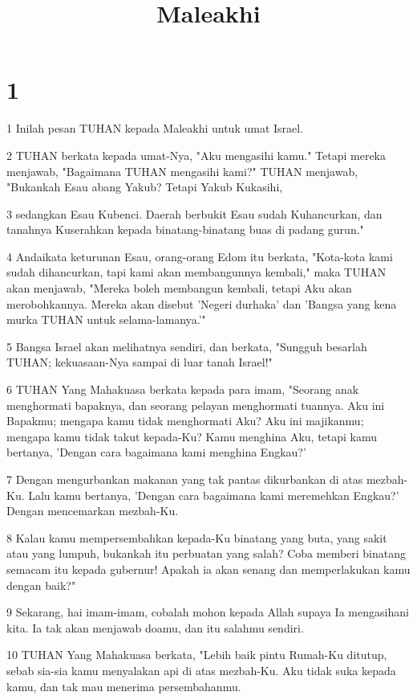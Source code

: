 

\title{Maleakhi}


\chapter{1}

\par 1 Inilah pesan TUHAN kepada Maleakhi untuk umat Israel.
\par 2 TUHAN berkata kepada umat-Nya, "Aku mengasihi kamu." Tetapi mereka menjawab, "Bagaimana TUHAN mengasihi kami?" TUHAN menjawab, "Bukankah Esau abang Yakub? Tetapi Yakub Kukasihi,
\par 3 sedangkan Esau Kubenci. Daerah berbukit Esau sudah Kuhancurkan, dan tanahnya Kuserahkan kepada binatang-binatang buas di padang gurun."
\par 4 Andaikata keturunan Esau, orang-orang Edom itu berkata, "Kota-kota kami sudah dihancurkan, tapi kami akan membangunnya kembali," maka TUHAN akan menjawab, "Mereka boleh membangun kembali, tetapi Aku akan merobohkannya. Mereka akan disebut 'Negeri durhaka' dan 'Bangsa yang kena murka TUHAN untuk selama-lamanya.'"
\par 5 Bangsa Israel akan melihatnya sendiri, dan berkata, "Sungguh besarlah TUHAN; kekuasaan-Nya sampai di luar tanah Israel!"
\par 6 TUHAN Yang Mahakuasa berkata kepada para imam, "Seorang anak menghormati bapaknya, dan seorang pelayan menghormati tuannya. Aku ini Bapakmu; mengapa kamu tidak menghormati Aku? Aku ini majikanmu; mengapa kamu tidak takut kepada-Ku? Kamu menghina Aku, tetapi kamu bertanya, 'Dengan cara bagaimana kami menghina Engkau?'
\par 7 Dengan mengurbankan makanan yang tak pantas dikurbankan di atas mezbah-Ku. Lalu kamu bertanya, 'Dengan cara bagaimana kami meremehkan Engkau?' Dengan mencemarkan mezbah-Ku.
\par 8 Kalau kamu mempersembahkan kepada-Ku binatang yang buta, yang sakit atau yang lumpuh, bukankah itu perbuatan yang salah? Coba memberi binatang semacam itu kepada gubernur! Apakah ia akan senang dan memperlakukan kamu dengan baik?"
\par 9 Sekarang, hai imam-imam, cobalah mohon kepada Allah supaya Ia mengasihani kita. Ia tak akan menjawab doamu, dan itu salahmu sendiri.
\par 10 TUHAN Yang Mahakuasa berkata, "Lebih baik pintu Rumah-Ku ditutup, sebab sia-sia kamu menyalakan api di atas mezbah-Ku. Aku tidak suka kepada kamu, dan tak mau menerima persembahanmu.
